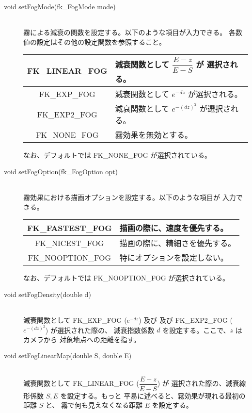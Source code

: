 \begin{description}
 \item[\hspace*{0.6cm}void setFogMode(fk\_FogMode mode)] ~ \\
	霧による減衰の関数を設定する。以下のような項目が入力できる。
	各数値の設定はその他の設定関数を参照すること。
	\begin{center}
	\begin{tabular}{|c|p{7cm}|}
	\hline
	FK\_LINEAR\_FOG & 減衰関数として \(\dfrac{E - z}{E - S}\) が
		選択される。\\ \hline
	FK\_EXP\_FOG & 減衰関数として \(e^{-dz}\) が選択される。\\ \hline
	FK\_EXP2\_FOG & 減衰関数として \(e^{-(dz)^2}\) が選択される。\\ \hline
	FK\_NONE\_FOG & 霧効果を無効とする。\\ \hline
	\end{tabular}
	\end{center}
	なお、デフォルトでは FK\_NONE\_FOG が選択されている。

 \item[\hspace*{0.6cm}void setFogOption(fk\_FogOption opt)] ~ \\
	霧効果における描画オプションを設定する。以下のような項目が
	入力できる。
	\begin{center}
	\begin{tabular}{|c|p{7cm}|}
	\hline
	FK\_FASTEST\_FOG & 描画の際に、速度を優先する。\\ \hline
	FK\_NICEST\_FOG & 描画の際に、精細さを優先する。\\ \hline
	FK\_NOOPTION\_FOG & 特にオプションを設定しない。\\ \hline
	\end{tabular}
	\end{center}
	なお、デフォルトでは FK\_NOOPTION\_FOG が選択されている。

 \item[\hspace*{0.6cm}void setFogDensity(double d)] ~ \\
	減衰関数として FK\_EXP\_FOG (\(e^{-dz}\)) 及び
	及び FK\_EXP2\_FOG (\(e^{-(dz)^2}\)) が選択された際の、	
	減衰指数係数 \(d\) を設定する。ここで、\(z\) はカメラから
	対象地点への距離を指す。

 \item[\hspace*{0.6cm}void setFogLinearMap(double S, double E)] ~ \\
	減衰関数として FK\_LINEAR\_FOG (\(\dfrac{E - z}{E - S}\)) が
	選択された際の、減衰線形係数 \(S, E\) を設定する。もっと
	平易に述べると、霧効果が現れる最初の距離 \(S\) と、
	霧で何も見えなくなる距離 \(E\) を設定する。


\end{description}
